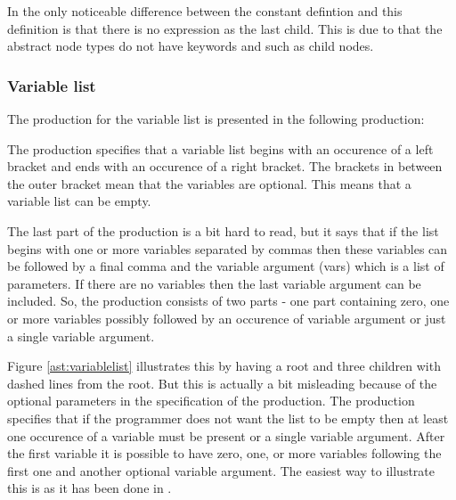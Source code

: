 
In  the only noticeable difference between the constant defintion and this definition is that there is no expression as the last child. This is due to that the abstract node types do not have keywords and such as child nodes.

\subsubsection{Variable list}%
The production for the variable list is presented in the following production:%

\begin{ebnf}%
\end{ebnf}%

The production specifies that a variable list begins with an occurence of a left bracket and ends with an occurence of a right bracket. The brackets in between the outer bracket mean that the variables are optional. This means that a variable list can be empty.%

The last part of the production is a bit hard to read, but it says that if the list begins with one or more variables separated by commas then these variables can be followed by a final comma and the variable argument (vars) which is a list of parameters. If there are no variables then the last variable argument can be included. So, the production consists of two parts - one part containing zero, one or more variables possibly followed by an occurence of variable argument or just a single variable argument.

%

Figure \ref{ast:variablelist} illustrates this by having a root and three children with dashed lines from the root. But this is actually a bit misleading because of the optional parameters in the specification of the production. The production specifies that if the programmer does not want the list to be empty then at least one occurence of a variable must be present or a single variable argument. After the first variable it is possible to have zero, one, or more variables following the first one and another optional variable argument. The easiest way to illustrate this is as it has been done in .%

